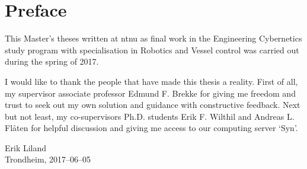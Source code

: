 
\section*{\huge Preface}
\hfill
\noindent 

This Master's theses written at \gls{ntnu} as final work in the Engineering Cybernetics study program with specialisation in Robotics and Vessel control was carried out during the spring of 2017.

I would like to thank the people that have made this thesis a reality. First of all, my supervisor associate professor Edmund F. Brekke for giving me freedom and trust to seek out my own solution and guidance with constructive feedback. Next but not least, my co-supervisors Ph.D. students Erik F. Wilthil and Andreas L. Flåten for helpful discussion and giving me access to our computing server `Syn'. 

\vspace{2 cm} 
\begin{center}
Erik Liland \\
Trondheim, 2017--06--05
\end{center}
